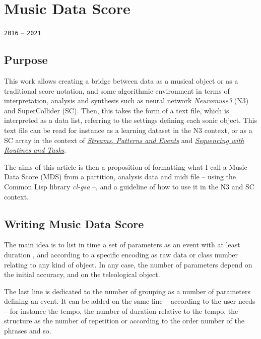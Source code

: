 \chapter{Music Data Score}
\thispagestyle{empty}

\label{mds}
{\texttt{2016} -- \texttt{2021}}

\bigskip
\smallskip

\section{Purpose}
\label{purp}

This work allows creating a bridge between data as a musical object or as a traditional score notation, and some algorithmic environment in terms of interpretation, analysis and synthesis such as neural network \textsl{Neuromuse3} (N3) and SuperCollider (SC). 
Then, this takes the form of a text file, which is interpreted as a data list, referring to the settings defining each sonic object. This text file can be read for instance as a learning dataset  in the N3 context, 
or as a SC array in the context of \href{http://doc.sccode.org/Tutorials/Streams-Patterns-Events1.html}{\textit{Streams, Patterns and Events}} and \href{http://doc.sccode.org/Tutorials/Getting-Started/15-Sequencing-with-Routines-and-Tasks.html}{\textit{Sequencing with Routines and Tasks}}.

The aims of this article is then a proposition of formatting what I call a Music Data Score (MDS) from a partition, analysis data and midi file -- using the Common Lisp library \textsl{cl-gsa} --, and a guideline of how to use it in the N3 and SC context.

\section{Writing Music Data Score}

The main idea is to list in time a set of parameters as an event with at least duration , and according to a specific encoding as raw data or class number relating to any kind of object. In any case, the number of parameters depend on the initial accuracy, and on the teleological object.

The last line is dedicated to the number of grouping as a number of parameters defining an event. It can be added on the same line -- according to the user needs -- for instance the tempo, the number of duration relative to the tempo, the structure as the number of repetition or according to the order number of the phrases and so.

